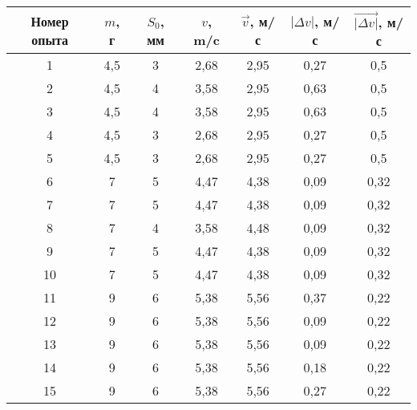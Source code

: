\begin{tabular}{|c|c|c|c|c|c|c|}
    \hline
    Номер опыта & $m$, г & $S_0$, мм & $v$, m/c & $\vec{v}$, м/с & $|\Delta v|$, м/с & $\vec{|\Delta v|}$, м/с \\ 
    \hline
              1 & 4,5    & 3         & 2,68     & 2,95           & 0,27              & 0,5                     \\ 
    \hline
              2 & 4,5    & 4         & 3,58     & 2,95           & 0,63              & 0,5                     \\ 
    \hline
              3 & 4,5    & 4         & 3,58     & 2,95           & 0,63              & 0,5                     \\ 
    \hline
              4 & 4,5    & 3         & 2,68     & 2,95           & 0,27              & 0,5                     \\ 
    \hline
              5 & 4,5    & 3         & 2,68     & 2,95           & 0,27              & 0,5                     \\  
    \hline
              6 & 7      & 5         & 4,47     & 4,38           & 0,09              & 0,32                    \\ 
    \hline
              7 & 7      & 5         & 4,47     & 4,38           & 0,09              & 0,32                    \\ 
    \hline
              8 & 7      & 4         & 3,58     & 4,48           & 0,09              & 0,32                    \\ 
    \hline
              9 & 7      & 5         & 4,47     & 4,38           & 0,09              & 0,32                    \\ 
    \hline
             10 & 7      & 5         & 4,47     & 4,38           & 0,09              & 0,32                    \\ 
    \hline
             11 & 9      & 6         & 5,38     & 5,56           & 0,37              & 0,22                    \\ 
    \hline
             12 & 9      & 6         & 5,38     & 5,56           & 0,09              & 0,22                    \\ 
    \hline
             13 & 9      & 6         & 5,38     & 5,56           & 0,09              & 0,22                    \\ 
    \hline
             14 & 9      & 6         & 5,38     & 5,56           & 0,18              & 0,22                    \\ 
    \hline
             15 & 9      & 6         & 5,38     & 5,56           & 0,27              & 0,22                    \\ 
    \hline
\end{tabular}